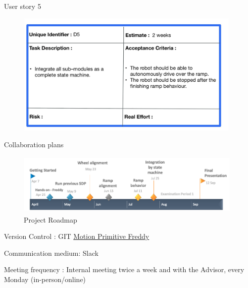 \documentclass{beamer}
\begin{document}
\begin{frame}{User story 5}
\begin{figure}[H]
            \centering
            \includegraphics[width=11cm  , height= 6cm]{user_story5.jpg}
        \end{figure}

\end{frame}


\begin{frame}{Collaboration plans}
\begin{figure}[H]
            \centering
            \includegraphics[width=11cm  , height= 3cm]{roadmap.png}
            \caption{Project Roadmap}
            \label{fig:roadmap}
        \end{figure}
Version Control : GIT \href{https://github.com/HBRS-SDP/ss22-motion-primitive-freddy}{Motion Primitive Freddy}

Communication medium: Slack

Meeting frequency :  Internal meeting twice a week and with the Advisor, every Monday (in-person/online)

\end{frame}
\end{document}
